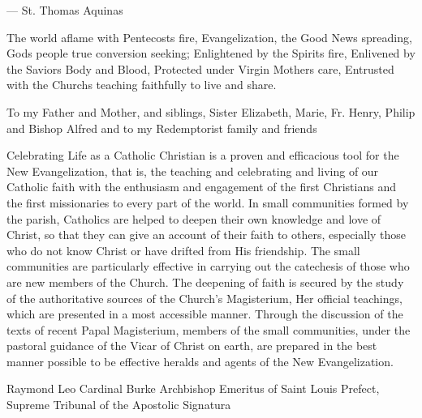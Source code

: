 \documentclass[oneside]{book}
\begin{document}
--- St. Thomas Aquinas


The world aflame with Pentecosts fire, Evangelization, the Good News spreading,
Gods people true conversion seeking; Enlightened by the Spirits fire, Enlivened
by the Saviors Body and Blood, Protected under Virgin Mothers care, Entrusted
with the Churchs teaching faithfully to live and share.


To my Father and Mother, and siblings, Sister Elizabeth, Marie, Fr. Henry,
Philip and Bishop Alfred and to my Redemptorist family and friends


\maketitle


Celebrating Life as a Catholic Christian is a proven and efficacious tool for
the New Evangelization, that is, the teaching and celebrating and living of our
Catholic faith with the enthusiasm and engagement of the first Christians and
the first missionaries to every part of the world.  In small communities formed
by the parish, Catholics are helped to deepen their own knowledge and love of
Christ, so that they can give an account of their faith to others, especially
those who do not know Christ or have drifted from His friendship.  The small
communities are particularly effective in carrying out the catechesis of those
who are new members of the Church.  The deepening of faith is secured by the
study of the authoritative sources of the Church's Magisterium, Her official
teachings, which are presented in a most accessible manner.  Through the
discussion of the texts of recent Papal Magisterium, members of the small
communities, under the pastoral guidance of the Vicar of Christ on earth, are
prepared in the best manner possible to be effective heralds and agents of the
New Evangelization.

Raymond Leo Cardinal Burke
Archbishop Emeritus of Saint Louis
Prefect, Supreme Tribunal of the Apostolic Signatura

\end{document}
